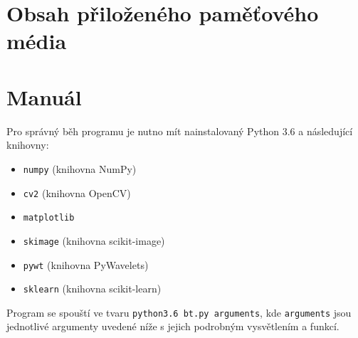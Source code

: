 
\chapter{Obsah přiloženého paměťového média}

\chapter{Manuál}
Pro správný běh programu je nutno mít nainstalovaný Python 3.6 a následující knihovny:

\begin{itemize}
    \item \verb=numpy= (knihovna NumPy)
    \item \verb=cv2= (knihovna OpenCV)
    \item \verb=matplotlib=
    \item \verb=skimage= (knihovna scikit-image)
    \item \verb=pywt= (knihovna PyWavelets)
    \item \verb=sklearn= (knihovna scikit-learn)
\end{itemize}

Program se spouští ve tvaru \verb=python3.6 bt.py arguments=, kde \verb=arguments= jsou jednotlivé argumenty uvedené níže s jejich podrobným vysvětlením a funkcí. 

